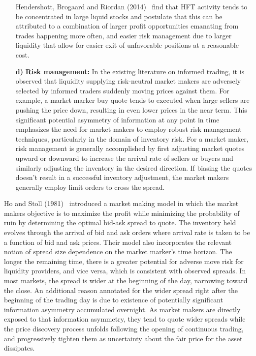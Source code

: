\begin{enumerate}
Hendershott, Brogaard and Riordan (2014)~\cite{hendershott2014} find that HFT activity tends to be concentrated in large liquid stocks and postulate that this can be attributed to a combination of larger profit opportunities emanating from trades happening more often, and easier risk management due to larger liquidity that allow for easier exit of unfavorable positions at a reasonable cost. 

\item[\textbf{d)}] \textbf{Risk management:} In the existing literature on informed trading, it is observed that liquidity supplying risk-neutral market makers are adversely selected by informed traders suddenly moving prices against them. For example, a market marker buy quote tends to executed when large sellers are pushing the price down, resulting in even lower prices in the near term. This significant potential asymmetry of information at any point in time emphasizes the need for market makers to employ robust risk management techniques, particularly in the domain of inventory risk. For a market maker, risk management is generally accomplished by first adjusting market quotes upward or downward to increase the arrival rate of sellers or buyers and similarly adjusting the inventory in the desired direction. If biasing the quotes doesn't result in a successful inventory adjustment, the market makers generally employ limit orders to cross the spread.
\end{enumerate}


Ho and Stoll (1981)~\cite{ho1981} introduced a market making model in which the market makers objective is to maximize the profit while minimizing the probability of ruin by determining the optimal bid-ask spread to quote. The inventory held evolves through the arrival of bid and ask orders where arrival rate is taken to be a function of bid and ask prices. Their model also incorporates the relevant notion of spread size dependence on the market marker's time horizon. The longer the remaining time, there is a greater potential for adverse move risk for liquidity providers, and vice versa, which is consistent with observed spreads. In most markets, the spread is wider at the beginning of the day, narrowing toward the close. An additional reason annotated for the wider spread right after the beginning of the trading day is due to existence of potentially significant information asymmetry accumulated overnight. As market makers are directly exposed to that information asymmetry, they tend to quote wider spreads while the price discovery process unfolds following the opening of continuous trading, and progressively tighten them as uncertainty about the fair price for the asset dissipates.


